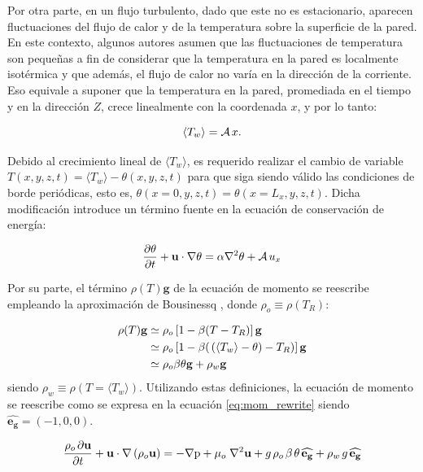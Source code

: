 Por otra parte, en un flujo turbulento, dado que este no es estacionario, aparecen fluctuaciones del flujo de calor y de la temperatura sobre la superficie de la pared. En este contexto, algunos autores \cite{kasagi1992direct,tao1960} asumen que las fluctuaciones de temperatura son pequeñas a fin de considerar que la temperatura en la pared es localmente isotérmica y que además, el flujo de calor no varía en la dirección de la corriente. Eso equivale a suponer que la temperatura en la pared, promediada en el tiempo y en la dirección $Z$, crece linealmente con la coordenada $x$, y por lo tanto: 

$$
\langle T_w \rangle = \mathcal{A} \hspace{0.5mm} x.
$$

Debido al crecimiento lineal de $\langle T_w \rangle$, es requerido realizar el cambio de variable $T(x,y,z,t) = \langle T_w \rangle - \theta(x,y,z,t)$ para que siga siendo válido las condiciones de borde periódicas, esto es, $\theta(x=0,y,z,t)=\theta(x=L_x,y,z,t)$. Dicha modificación introduce un término fuente en la ecuación de conservación de energía:

\begin{equation}
\frac{ \partial \theta }{ \partial t } + \mathbf{u} \cdot \nabla \theta = \alpha \nabla^2 \theta + \mathcal{A} \hspace{0.5mm} u_x 
\label{eq:energy_pcb_source}
\end{equation}

\newpage
Por su parte, el término $\rho(T) \mathbf{g}$ de la ecuación de momento se reescribe empleando la aproximación de Bousinessq \cite{incropera}, donde $\rho_o \equiv \rho(T_R)$:

\begin{align}
\rho(T) \mathbf{g} &\simeq \rho_o \left[ 1 - \beta (T - T_R) \right] \mathbf{g} \\
				   &\simeq \rho_o \left[ 1 - \beta ( \hspace{0.5mm} (\langle T_w \rangle - \theta) - T_R) \right] \mathbf{g} \\
 		           &\simeq \rho_o \beta \theta \mathbf{g} + \rho_w \mathbf{g}
\label{eq:bussinesq}
\end{align}
siendo $\rho_w \equiv \rho(T=\langle T_w \rangle)$. Utilizando estas definiciones, la ecuación de momento se reescribe como se expresa en la ecuación \ref{eq:mom_rewrite} siendo $\mathbf{\hat{e_g}}=(-1,0,0)$.

\begin{equation}
\frac{ \rho_o \hspace{0.5mm} \partial \mathbf{u}}{\partial t} + \mathbf{u} \cdot \nabla  \left( \rho_o \mathbf{u} \right) = -\nabla \text{p} + \mu_o \hspace{1mm} {\nabla}^2 \mathbf{u}  + g \hspace{0.5mm} \rho_o \hspace{0.5mm} \beta \hspace{0.5mm} \theta \hspace{0.5mm} \mathbf{\widehat{e_g}} + \rho_w \hspace{0.5mm} g \hspace{0.5mm} \mathbf{\widehat{e_g}}
\label{eq:mom_rewrite}  
\end{equation}


